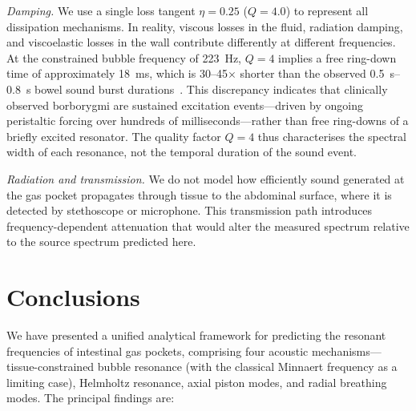 \documentclass[review]{elsarticle}
\begin{document}
\emph{Damping.}  We use a single loss tangent $\eta = 0.25$ ($Q = 4.0$) to
represent all dissipation mechanisms.  In reality, viscous losses in the
fluid, radiation damping, and viscoelastic losses in the wall contribute
differently at different frequencies.  At the constrained bubble frequency
of \SI{223}{\hertz}, $Q = 4$ implies a free ring-down time of approximately
\SI{18}{\milli\second}, which is 30--45$\times$ shorter than the observed
\SIrange{0.5}{0.8}{\second} bowel sound burst durations~\cite{Ching2012}.
This discrepancy indicates that clinically observed borborygmi are sustained
excitation events---driven by ongoing peristaltic forcing over hundreds of
milliseconds---rather than free ring-downs of a briefly excited resonator.
The quality factor $Q = 4$ thus characterises the spectral width of each
resonance, not the temporal duration of the sound event.

\emph{Radiation and transmission.}  We do not model how efficiently sound
generated at the gas pocket propagates through tissue to the abdominal surface,
where it is detected by stethoscope or microphone.  This transmission path
introduces frequency-dependent attenuation that would alter the measured
spectrum relative to the source spectrum predicted here.

\section{Conclusions}
\label{sec:conclusions}

We have presented a unified analytical framework for predicting the resonant
frequencies of intestinal gas pockets, comprising four acoustic
mechanisms---tissue-constrained bubble resonance (with the classical Minnaert
frequency as a limiting case), Helmholtz resonance, axial piston modes, and
radial breathing modes.  The principal findings are:
\end{document}
